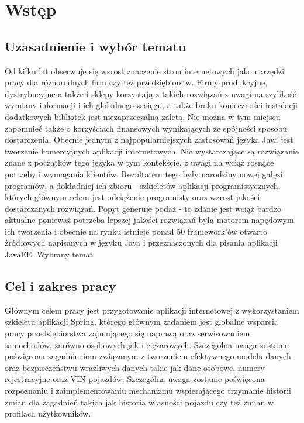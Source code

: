 \chapter{Wstęp}
\label{chaper:introduction}

\section{Uzasadnienie i wybór tematu}
	Od kilku lat obserwuje się wzrost znaczenie stron internetowych jako narzędzi pracy dla różnorodnych firm czy też przedsiębiorstw. Firmy produkcyjne, dystrybucyjne a także i sklepy korzystają z takich rozwiązań z uwagi na szybkość wymiany informacji i ich globalnego zasięgu, a także braku konieczności instalacji dodatkowych bibliotek jest niezaprzeczalną zaletą. Nie można w tym miejscu zapomnieć także o korzyściach finansowych wynikających ze spójności sposobu dostarczenia. 
	Obecnie jednym z najpopularniejszych zastosowań języka Java jest tworzenie komercyjnych aplikacji internetowych. Nie wystarczające są rozwiązanie znane z początków tego języka w tym kontekście, z uwagi na wciąż rosnące potrzeby i wymagania klientów. Rezultatem tego były narodziny nowej gałęzi programów, a dokładniej ich zbioru - szkieletów aplikacji programistycznych, których głównym celem jest odciążenie programisty oraz wzrost jakości dostarczanych rozwiązań. Popyt generuje podaż - to zdanie jest wciąż bardzo aktualne ponieważ potrzeba lepszej jakości rozwiązań była motorem napędowym ich tworzenia i obecnie na rynku istnieje ponad 50 framework'ów otwarto źródłowych napisanych w języku Java i przeznaczonych dla pisania aplikacji JavaEE. 
	Wybrany temat 
\section{Cel i zakres pracy}
	Głównym celem pracy jest przygotowanie aplikacji internetowej z wykorzystaniem szkieletu aplikacji Spring, którego głównym zadaniem
	jest globalne wsparcia pracy przedsiębiorstwa zajmującego się naprawą oraz serwisowaniem samochodów, zarówno osobowych jak i ciężarowych.
	Szczególna uwaga zostanie poświęcona zagadnieniom związanym z tworzeniem efektywnego modelu danych oraz bezpieczeństwu wrażliwych danych takie jak dane osobowe, numery rejestracyjne oraz VIN pojazdów. Szczególna uwaga zostanie poświęcona rozpoznaniu i zaimplementowaniu mechanizmu wspierającego trzymanie
	historii zmian dla zagadnień takich jak historia własności pojazdu czy też zmian w profilach użytkowników.
